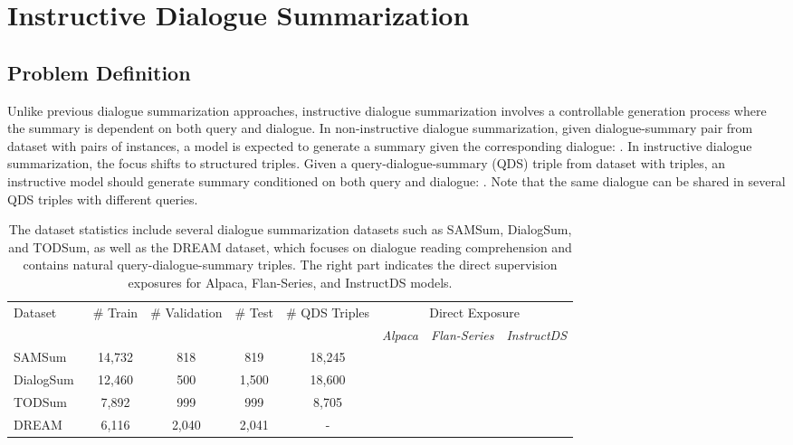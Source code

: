 \documentclass[11pt]{article}
\newcommand{\cmark}{\ding{51}}\newcommand{\xmark}{\ding{55}}\usepackage{subcaption}
\begin{document}
\section{Instructive Dialogue Summarization} 

    \subsection{Problem Definition}

        Unlike previous dialogue summarization approaches, instructive dialogue summarization involves a controllable generation process where the summary is dependent on both query and dialogue. In non-instructive dialogue summarization, given dialogue-summary pair  from dataset  with  pairs of instances, a model  is expected to generate a summary given the corresponding dialogue: . In instructive dialogue summarization, the focus shifts to structured triples. Given a query-dialogue-summary (QDS) triple  from dataset  with  triples, an instructive model  should generate summary conditioned on both query and dialogue: . Note that the same dialogue can be shared in several QDS triples with different queries.


\begin{table*}[t]
        \centering
        \begin{adjustbox}{width=1.00\textwidth,center}
        \begin{tabular}{| l | c | c | c | c | c  c  c |}
        \toprule
        \multirow{2}{*}{Dataset} & \multirow{2}{*}{\# Train} & \multirow{2}{*}{\# Validation} & \multirow{2}{*}{\# Test} & \multirow{2}{*}{\# QDS Triples} & \multicolumn{3}{c|}{Direct Exposure}  \\
        & & & & & \emph{Alpaca} & \emph{Flan-Series} & \emph{InstructDS} \\
        \hline
        SAMSum~\cite{gliwa-etal-2019-samsum} & 14,732 & 818 & 819 & 18,245 & \xmark & \cmark & \cmark  \\
        \hline
        DialogSum~\cite{chen-etal-2021-dialogsum} & 12,460 & 500 & 1,500 & 18,600 & \xmark & \xmark & \cmark \\
        \hline
        TODSum~\cite{zhao2021todsum} & 7,892 & 999 & 999 & 8,705 & \xmark & \xmark & \cmark \\
        \hline \hline
        DREAM~\cite{sun-etal-2019-dream} & 6,116 & 2,040 & 2,041 & - & \xmark & \cmark & \xmark \\ 
        \bottomrule
        \end{tabular}
        \end{adjustbox}
        \caption{The dataset statistics include several dialogue summarization datasets such as SAMSum, DialogSum, and TODSum, as well as the DREAM dataset, which focuses on dialogue reading comprehension and contains natural query-dialogue-summary triples. The right part indicates the direct supervision exposures for Alpaca, Flan-Series, and InstructDS models.
        }
        \label{tab:datasets}
    \end{table*}
\end{document}
